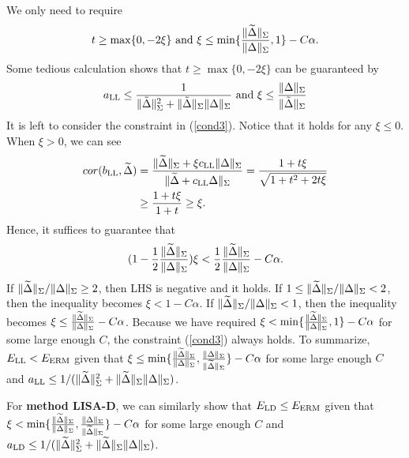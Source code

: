 We only need to require
\[
  t\geq \max\{0,-2\xi\}~\text{and}~\xi \leq \min\{\frac{\|\widetilde{\Delta}\|_{\Sigma}}{\|\Delta\|_{\Sigma}},1\}-C\alpha.
\]
Some tedious calculation shows that $t\geq \max\{0,-2\xi\}$ can be guaranteed by
\[
  a_{\textup{LL}}\leq\frac{1}{\|\tilde{\Delta}\|_{\Sigma}^2+\|\tilde{\Delta}\|_{\Sigma}\|\Delta\|_{\Sigma}}~\text{and}~\xi\leq \frac{\|\Delta\|_{\Sigma}}{\|\tilde{\Delta}\|_{\Sigma}}
\]
It is left to consider the constraint in (\ref{cond3}).
Notice that it holds for any $\xi\leq 0$. When $\xi>0$, we can see
\begin{align*}
cor(b_{\textup{LL}},\widetilde{\Delta})&=\frac{\|\widetilde{\Delta}\|_{\Sigma}+\xi c_{\textup{LL}}\|\Delta\|_{\Sigma}}{\|\widetilde{\Delta}+c_{\textup{LL}}\Delta\|_{\Sigma}}=\frac{1+t\xi}{\sqrt{1+t^2+2t\xi}}\\
&\geq \frac{1+t\xi}{1+t}\geq \xi.
\end{align*}
Hence, it suffices to guarantee that 
\[
   (1-\frac{1}{2}\frac{\|\widetilde{\Delta}\|_{\Sigma}}{\|\Delta\|_{\Sigma}})\xi<\frac{1}{2}\frac{\|\widetilde{\Delta}\|_{\Sigma}}{\|\Delta\|_{\Sigma}}-C\alpha.
\]
If $\|\widetilde{\Delta}\|_{\Sigma}/\|\Delta\|_{\Sigma}\geq 2$, then LHS is negative and it holds. If $1\leq \|\widetilde{\Delta}\|_{\Sigma}/\|\Delta\|_{\Sigma}< 2$, then the inequality becomes $\xi< 1-C\alpha$. If $\|\widetilde{\Delta}\|_{\Sigma}/\|\Delta\|_{\Sigma}<1$, then the inequality becomes $\xi\leq \frac{\|\widetilde{\Delta}\|_{\Sigma}}{\|\Delta\|_{\Sigma}}-C\alpha$.
Because we have required $\xi < \min\{\frac{\|\widetilde{\Delta}\|_{\Sigma}}{\|\Delta\|_{\Sigma}},1\}-C\alpha$ for some large enough $C$, the constraint (\ref{cond3}) always holds.
To summarize, $E_{\textup{LL}}< E_{\textup{ERM}}$ given that $\xi \leq \min\{\frac{\|\widetilde{\Delta}\|_{\Sigma}}{\|\Delta\|_{\Sigma}},\frac{\|\Delta\|_{\Sigma}}{\|\widetilde{\Delta}\|_{\Sigma}}\}-C\alpha$ for some large enough $C$ and $a_{\textup{LL}}\leq 1/(\|\widetilde{\Delta}\|_{\Sigma}^2+\|\widetilde{\Delta}\|_{\Sigma}\|\Delta\|_{\Sigma})$.



For \textbf{method LISA-D}, we can similarly show that $E_{\textup{LD}}\leq E_{\textup{ERM}}$ given that $\xi < \min\{\frac{\|\widetilde{\Delta}\|_{\Sigma}}{\|\Delta\|_{\Sigma}},\frac{\|\Delta\|_{\Sigma}}{\|\widetilde{\Delta}\|_{\Sigma}}\}-C\alpha$ for some large enough $C$ and $a_{\textup{LD}}\leq 1/(\|\widetilde{\Delta}\|_{\Sigma}^2+\|\widetilde{\Delta}\|_{\Sigma}\|\Delta\|_{\Sigma})$.

